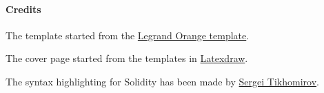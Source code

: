 \paragraph{Credits} \label{sec:credits}

The template started from the \href{https://www.latextemplates.com/template/legrand-orange-book}{Legrand Orange template}.

The cover page started from the templates in \href{https://latexdraw.com/tikz-cover-pages-gallery/}{Latexdraw}.

The syntax highlighting for Solidity has been made by \href{https://github.com/s-tikhomirov/solidity-latex-highlighting}{Sergei Tikhomirov}.
